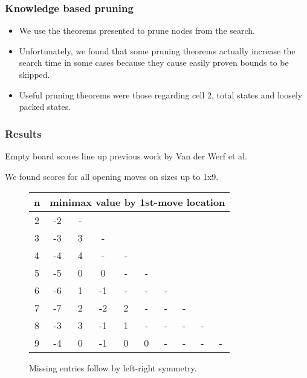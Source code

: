 \documentclass{beamer}
\begin{document}
    \begin{frame}
        \frametitle{Knowledge based pruning}
        \begin{itemize}
            \item We use the theorems presented to prune nodes from the search.
            \item Unfortunately, we found that some pruning theorems actually increase the search time
                in some cases because they cause easily proven bounds to be skipped.
            \item Useful pruning theorems were those regarding cell 2, total states and loosely packed states.
        \end{itemize}
    \end{frame}

    \begin{frame}
        \frametitle{Results}
        Empty board scores line up previous work by Van der Werf et al.

        We found scores for all opening moves on sizes up to 1x9.

        \begin{figure}[th]
        \begin{tabular}{|c|ccccccccc|} \hline
        n & \multicolumn{9}{c|}{minimax value by 1st-move location} \\ \hline
        2 & -2 & - &&&&&&& \\
        3 & -3 & 3 & - &&&&&& \\
        4 & -4 & 4 & - & - &&&&& \\
        5 & -5 & 0 & 0 & - & - &&&& \\
        6 & -6 & 1 & -1 & - & - & - &&&\\
        7 & -7 &  2 & -2 & 2 & - & - & - &&\\
        8 & -3 &  3 & -1 & 1 & - & - & - & - &\\
        9 & -4 & 0  & -1  & 0 & 0 & - & - & - & -\\ \hline
        \end{tabular}
        \caption{Missing entries follow by left-right symmetry.}\label{fig:1st_move_value}
        \label{fig:mmx}
        \end{figure}
    \end{frame}
\end{document}
